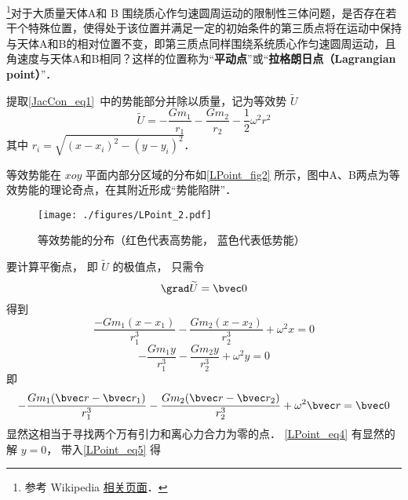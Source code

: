 
\begin{issues}
\issueTODO
\end{issues}


\footnote{参考 Wikipedia \href{https://en.wikipedia.org/wiki/Lagrange_point}{相关页面}．}对于大质量天体A和 B 围绕质心作匀速圆周运动的限制性三体问题，是否存在若干个特殊位置，使得处于该位置并满足一定的初始条件的第三质点将在运动中保持与天体A和B的相对位置不变，即第三质点同样围绕系统质心作匀速圆周运动，且角速度与天体A和B相同？这样的位置称为“\textbf{平动点}”或“\textbf{拉格朗日点（Lagrangian point）}”．

提取\autoref{JacCon_eq1}~中的势能部分并除以质量，记为等效势 $\widetilde{U}$ 
\begin{equation}
\widetilde{U} = -\frac{Gm_1}{r_1} -\frac{Gm_2}{r_2} -\frac{1}{2}\omega^2 r^2
\end{equation}
其中 $r_i = \sqrt{(x - x_i)^2 - (y - y_i)^2}$．

等效势能在 $xoy$ 平面内部分区域的分布如\autoref{LPoint_fig2} 所示，图中A、B两点为等效势能的理论奇点，在其附近形成“势能陷阱”． 
\begin{figure}[ht]
\centering
\texttt{[image: ./figures/LPoint\_2.pdf]}
\caption{等效势能的分布（红色代表高势能， 蓝色代表低势能）} \label{LPoint_fig2}
\end{figure}

要计算平衡点， 即 $\widetilde{U}$ 的极值点， 只需令
\begin{equation}
\grad \widetilde{U} = \bvec 0
\end{equation}
得到
\begin{equation}\label{LPoint_eq5}
\frac{-Gm_1(x-x_1)}{r_1^3} - \frac{Gm_2(x-x_2)}{r_2^3} + \omega^2 x = 0
\end{equation}
\begin{equation}\label{LPoint_eq4}
-\frac{Gm_1 y}{r_1^3} - \frac{Gm_2 y}{r_2^3} + \omega^2 y = 0
\end{equation}
即
\begin{equation}
-\frac{Gm_1(\bvec r - \bvec r_1)}{r_1^3} - \frac{Gm_2(\bvec r - \bvec r_2)}{r_2^3} + \omega^2 \bvec r = \bvec 0
\end{equation}
显然这相当于寻找两个万有引力和离心力合力为零的点． \autoref{LPoint_eq4} 有显然的解 $y = 0$， 带入\autoref{LPoint_eq5} 得



